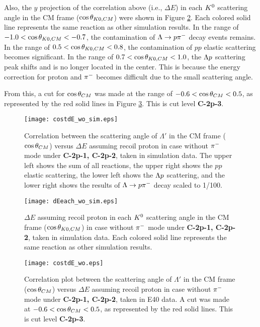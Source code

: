 Also, the $y$ projection of the correlation above (i.e., $\Delta E$) in each $K^{0}$ scattering angle in the CM frame ($\cos{\theta_{K0,CM}}$) were shown in Figure \ref{fig-dEeach_sim}. 
Each colored solid line represents the same reaction as other simulation results.
In the range of $-1.0<\cos{\theta_{K0,CM}}<-0.7$, the contamination of $\Lambda\to p\pi^{-}$ decay events remains. In the range of $0.5<\cos{\theta_{K0,CM}}<0.8$, the contamination of $pp$ elastic scattering becomes significant. In the range of $0.7<\cos{\theta_{K0,CM}}<1.0$, the $\Lambda p$ scattering peak shifts and is no longer located in the center. This is because the energy correction for proton and $\pi^{-}$ becomes difficult due to the small scattering angle.

From this, a cut for $\cos{\theta}_{CM}$ was made at the range of $-0.6<\cos{\theta}_{CM}<0.5$, as represented by the red solid lines in Figure \ref{fig-costdE}. This is cut level {\bf C-2p-3}.

\begin{figure}[!h]
  \begin{center}
    \texttt{[image: costdE\_wo\_sim.eps]}
    \caption{Correlation between the scattering angle of $\Lambda'$ in the CM frame ($\cos{\theta}_{CM}$) versus $\Delta E$ assuming recoil proton in case  without $\pi^{-}$ mode under {\bf C-2p-1, C-2p-2}, taken in simulation data. The upper left shows the sum of all reactions, the upper right shows the $pp$ elastic scattering, the lower left shows the $\Lambda p$ scattering, and the lower right shows the results of $\Lambda\to p\pi^{-}$ decay scaled to 1/100.}
    \label{fig-costdE_sim}
  \end{center}
\end{figure}

\begin{figure}[!h]
  \begin{center}
    \texttt{[image: dEeach\_wo\_sim.eps]}
    \caption{$\Delta E$ assuming recoil proton in each $K^{0}$ scattering angle in the CM frame ($\cos{\theta_{K0,CM}}$) in case  without $\pi^{-}$ mode under {\bf C-2p-1, C-2p-2}, taken in simulation data. Each colored solid line represents the same reaction as other simulation results.}
    \label{fig-dEeach_sim}
  \end{center}
\end{figure}

\begin{figure}[!h]
  \begin{center}
    \texttt{[image: costdE\_wo.eps]}
    \caption{Correlation plot between the scattering angle of $\Lambda'$ in the CM frame ($\cos{\theta}_{CM}$) versus $\Delta E$ assuming recoil proton in case  without $\pi^{-}$ mode under {\bf C-2p-1, C-2p-2}, taken in E40 data. A cut was made at $-0.6<\cos{\theta}_{CM}<0.5$, as represented by the red solid lines. This is cut level {\bf C-2p-3}.}
    \label{fig-costdE}
  \end{center}
\end{figure}



